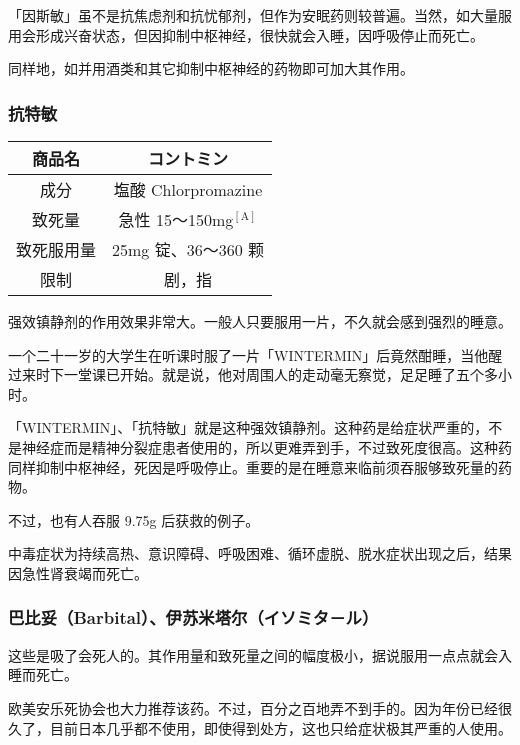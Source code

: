 \documentclass[UTF8]{ctexart}
\begin{document}
「因斯敏」虽不是抗焦虑剂和抗忧郁剂，但作为安眠药则较普遍。当然，如大量服用会形成兴奋状态，但因抑制中枢神经，很快就会入睡，因呼吸停止而死亡。

同样地，如并用酒类和其它抑制中枢神经的药物即可加大其作用。

\subsubsection*{抗特敏}

\begin{table}[htbp]
\begin{center}
\begin{tabular}{cc}

\toprule
商品名 & コントミン
 \\
\midrule
成分 & 塩酸 Chlorpromazine \\
致死量 & 急性 15～150mg$^\mathrm{[A]}$ \\
致死服用量 & 25mg 锭、36～360 颗 \\
限制& 剧，指 \\
\bottomrule
\end{tabular}
\end{center}
\end{table}

强效镇静剂的作用效果非常大。一般人只要服用一片，不久就会感到强烈的睡意。

一个二十一岁的大学生在听课时服了一片「WINTERMIN」后竟然酣睡，当他醒过来时下一堂课已开始。就是说，他对周围人的走动毫无察觉，足足睡了五个多小时。

「WINTERMIN」、「抗特敏」就是这种强效镇静剂。这种药是给症状严重的，不是神经症而是精神分裂症患者使用的，所以更难弄到手，不过致死度很高。这种药同样抑制中枢神经，死因是呼吸停止。重要的是在睡意来临前须吞服够致死量的药物。

不过，也有人吞服 9.75g 后获救的例子。

中毒症状为持续高热、意识障碍、呼吸困难、循环虚脱、脱水症状出现之后，结果因急性肾衰竭而死亡。

\subsubsection*{巴比妥（Barbital）、伊苏米塔尔（イソミタ－ル）}

这些是吸了会死人的。其作用量和致死量之间的幅度极小，据说服用一点点就会入睡而死亡。

欧美安乐死协会也大力推荐该药。不过，百分之百地弄不到手的。因为年份已经很久了，目前日本几乎都不使用，即使得到处方，这也只给症状极其严重的人使用。
\end{document}
